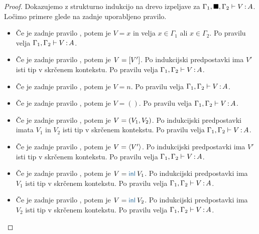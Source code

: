 \begin{proof}
	Dokazujemo z strukturno indukcijo na drevo izpeljave za $\Gamma_1, \blacksquare, \Gamma_2 \vdash V \mathinner{:} A$.
	Ločimo primere glede na zadnje uporabljeno pravilo.
	
	\begin{itemize}
		\item[\sitem] Če je zadnje pravilo , potem je $V = x$ in velja $x \in \Gamma_1$ ali $x \in \Gamma_2$.
		Po pravilu  velja $\Gamma_1, \Gamma_2 \vdash V \mathinner{:} A$.

		\item Če je zadnje pravilo , potem je $V = [V']$.
		Po indukcijski predpostavki ima $V'$ isti tip v skrčenem kontekstu.
		Po pravilu  velja $\Gamma_1, \Gamma_2 \vdash V \mathinner{:} A$.
		
		\item Če je zadnje pravilo , potem je $V = n$. Po pravilu  velja $\Gamma_1, \Gamma_2 \vdash V \mathinner{:} A$.
		
		\item Če je zadnje pravilo , potem je $V = ()$. Po pravilu  velja $\Gamma_1, \Gamma_2 \vdash V \mathinner{:} A$.
		
		\item Če je zadnje pravilo , potem je $V =( V_1 , V_2 )$.
		Po indukcijski predpostavki imata $V_1$ in $V_2$ isti tip v skrčenem kontekstu.
		Po pravilu  velja $\Gamma_1, \Gamma_2 \vdash V \mathinner{:} A$.
		
		\item Če je zadnje pravilo , potem je $V = \langle V' \rangle$.
		Po indukcijski predpostavki ima $V'$ isti tip v skrčenem kontekstu.
		Po pravilu  velja $\Gamma_1, \Gamma_2 \vdash V \mathinner{:} A$.
		
		\item Če je zadnje pravilo , potem je $V = \tminl{V_1}$.
		Po indukcijski predpostavki ima $V_1$ isti tip v skrčenem kontekstu.
		Po pravilu  velja $\Gamma_1, \Gamma_2 \vdash V \mathinner{:} A$.
		
		\item Če je zadnje pravilo , potem je $V = \tminl{V_2}$.
		Po indukcijski predpostavki ima $V_2$ isti tip v skrčenem kontekstu.
		Po pravilu  velja $\Gamma_1, \Gamma_2 \vdash V \mathinner{:} A$.
		

\end{itemize}
\end{proof}
